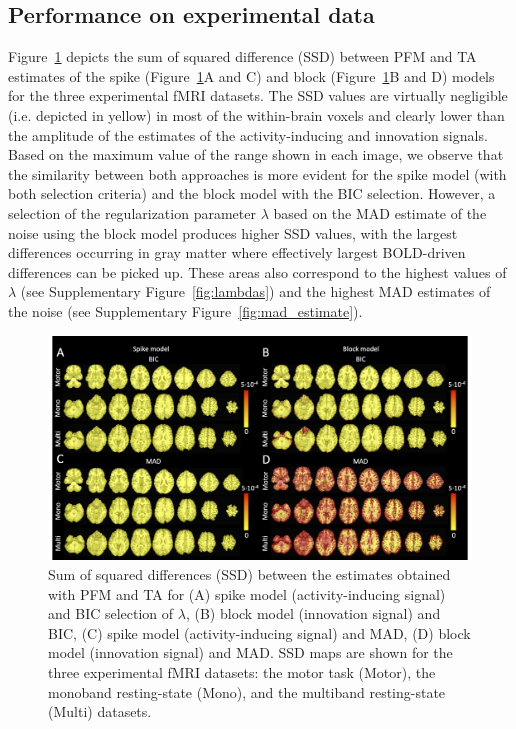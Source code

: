 \subsection{Performance on experimental data}

Figure~\ref{fig:rss} depicts the sum of squared difference (SSD) between PFM and TA estimates of the spike (Figure~\ref{fig:rss}A and C) and block (Figure~\ref{fig:rss}B and D) models for the three experimental fMRI datasets. The SSD values are virtually negligible (i.e. depicted in yellow) in most of the within-brain voxels and clearly lower than the amplitude of the estimates of the activity-inducing and innovation signals. Based on the maximum value of the range shown in each image, we observe that the similarity between both approaches is more evident for the spike model (with both selection criteria) and the block model with the BIC selection. However, a selection of the regularization parameter $\lambda$ based on the MAD estimate of the noise using the block model produces higher SSD values, with the largest differences occurring in gray matter where effectively largest BOLD-driven differences can be picked up. These areas also correspond to the highest values of $\lambda$ (see Supplementary Figure~\ref{fig:lambdas}) and the highest MAD estimates of the noise (see Supplementary Figure~\ref{fig:mad_estimate}). 

\begin{figure}[t!]
    \begin{center}
        \includegraphics[width=\textwidth]{figures/comp_figure.png}
    \end{center}
    \caption{Sum of squared differences (SSD) between the estimates obtained with PFM and TA for (A) spike model (activity-inducing signal) and BIC selection of $\lambda$, (B) block model (innovation signal) and BIC, (C) spike model (activity-inducing signal) and MAD, (D) block model (innovation signal) and MAD. SSD maps are shown for the three experimental fMRI datasets: the motor task (Motor), the monoband resting-state (Mono), and the multiband resting-state (Multi) datasets.}
\label{fig:rss}
\end{figure}

